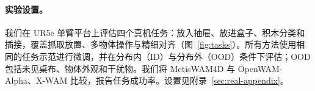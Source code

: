\paragraph{实验设置。}
我们在 UR5e 单臂平台上评估四个真机任务：放入抽屉、放进盒子、积木分类和插接，覆盖抓取放置、多物体操作与精细对齐（图~\ref{fig:tasks}）。所有方法使用相同的任务示范进行微调，并在分布内（ID）与分布外（OOD）条件下评估；OOD 包括未见桌布、物体外观和干扰物。我们将 MetisWAM4D 与 OpenWAM-Alpha、X-WAM 比较，报告任务成功率。设置见附录~\ref{sec:real-appendix}。

